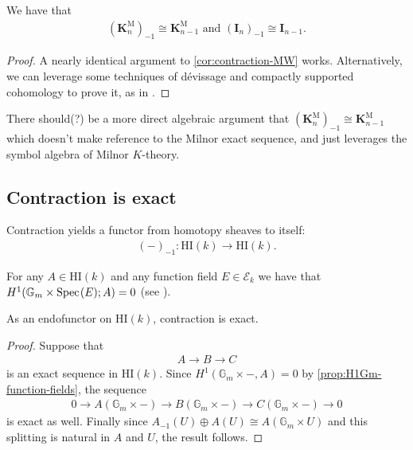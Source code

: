 \documentclass[11pt,openany]{book}
\providecommand{\HI}{\mathrm{HI}}
\providecommand{\KM}{\mathbf{K}^\mathrm{M}}
\begin{document}
\begin{corollary} We have that
\begin{align*}
    (\KM_n)_{-1} \cong \KM_{n-1} \text{ and } (\mathbf{I}_n)_{-1} \cong \mathbf{I}_{n-1}.
\end{align*}
\end{corollary}
\begin{proof} A nearly identical argument to \autoref{cor:contraction-MW} works. Alternatively, we can leverage some techniques of d\'evissage and compactly supported cohomology to prove it, as in \cite[2.9]{AF-vb-spheres}.
\end{proof}

\begin{note} There should(?) be a more direct algebraic argument that $\left( \KM_n \right)_{-1} \cong \KM_{n-1}$ which doesn't make reference to the Milnor exact sequence, and just leverages the symbol algebra of Milnor $K$-theory.
\end{note}

\subsection{Contraction is exact}

Contraction yields a functor from homotopy sheaves to itself:
\begin{align*}
    (-)_{-1} \colon \HI(k) \to \HI(k).
\end{align*}
%
\begin{proposition}\label{prop:H1Gm-function-fields} 
For any $A \in \HI(k)$ and any function field $E \in \mathcal{E}_k$ we have that $H^1( \mathbb{G}_m \times \text{Spec}\hspace{0.1em}(E);A) = 0$  (see \cite[4.10]{Deglise-finite-corr}).
\end{proposition}

\begin{proposition} As an endofunctor on $\HI(k)$, contraction is exact.
\end{proposition}
\begin{proof} Suppose that
\begin{align*}
    A \to B \to C
\end{align*}
is an exact sequence in $\HI(k)$. Since $H^1(\mathbb{G}_m \times -, A) = 0$ by \autoref{prop:H1Gm-function-fields}, the sequence
\begin{align*}
    0 \to A(\mathbb{G}_m \times -) \to B(\mathbb{G}_m \times -) \to C(\mathbb{G}_m \times -) \to 0
\end{align*}
is exact as well. Finally since $A_{-1}(U) \oplus A(U) \cong A(\mathbb{G}_m \times U)$ and this splitting is natural in $A$ and $U$, the result follows.
\end{proof}
\end{document}
